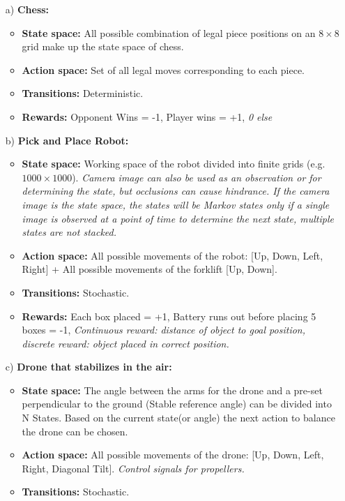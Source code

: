\documentclass{article}
\begin{document}
\begin{enumerate}
	\item[a)] \textbf{Chess:}
	\begin{itemize}
		\item \textbf{State space:} All possible combination of legal piece positions on an $8\times 8$ grid make up the state space of chess.
		\item \textbf{Action space:}  Set of all legal moves corresponding to each piece.
		\item \textbf{Transitions:} Deterministic.
		\item \textbf{Rewards:} Opponent Wins = -1, 
		Player wins = +1, \textit{0 else}
	\end{itemize}
	\item[b)]\textbf{Pick and Place Robot:}
	\begin{itemize}
		\item \textbf{State space:} Working space of the robot divided into finite grids (e.g. $1000\times 1000$). \textit{Camera image can also be used as an observation or for determining the state, but occlusions can cause hindrance. If the camera image is the state space, the states will be Markov states only if a single image is observed at a point of time to determine the next state, multiple states are not stacked. }
		\item \textbf{Action space:}  All possible movements of the robot: [Up, Down, Left, Right]
		+
		All possible movements of the forklift [Up, Down].		
		\item \textbf{Transitions:} Stochastic.
		\item \textbf{Rewards:} Each box placed = +1,		
		Battery runs out before placing 5 boxes = -1, \textit{Continuous reward: distance of object to goal position, discrete reward: object placed in correct position.}		
	\end{itemize}
	\item[c)]\textbf{Drone that stabilizes in the air:}
	\begin{itemize}
		\item \textbf{State space:} The angle between the arms for the drone and a pre-set perpendicular to the ground (Stable reference angle) can be divided into N States. Based on the current state(or angle) the next action to balance the drone can be chosen.
		\item \textbf{Action space:}  All possible movements of the drone:
		[Up, Down, Left, Right, Diagonal Tilt].	\textit{Control signals for propellers.}	
		\item \textbf{Transitions:} Stochastic.

\end{itemize}
\end{enumerate}
\end{document}
